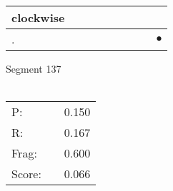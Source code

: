 \documentclass[landscape]{article}
\newcommand{\ssp}{\hspace{2pt}}
\newcommand{\mex}{\cellcolor{g}$\bullet$}
\begin{document}
\begin{tabular}{|l|p{10pt}|p{10pt}|p{10pt}|p{10pt}|p{10pt}|p{10pt}|p{10pt}|p{10pt}|}
\hline
\ssp clockwise \ssp&\hspace{2pt}&\hspace{2pt}&\hspace{2pt}&\hspace{2pt}&\hspace{2pt}&\hspace{2pt}&\hspace{2pt}&\hspace{2pt}\\
\hline
\ssp \cellcolor{ref7}. \ssp&\hspace{2pt}&\hspace{2pt}&\hspace{2pt}&\hspace{2pt}&\hspace{2pt}&\hspace{2pt}&\hspace{2pt}&\hspace{2pt}\mex\\
\hline
\end{tabular}

\vspace{6pt}
\noindent Segment 137\\\\
\noindent\begin{tabular}{lm{12pt}r}
\hline
P:&&0.150\\
R:&&0.167\\
Frag:&&0.600\\
Score:&&0.066\\
\end{tabular}

\newpage
\end{document}
